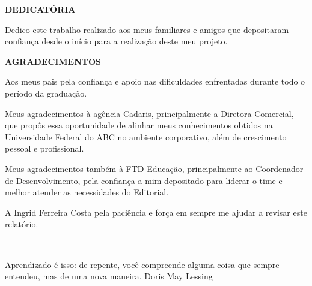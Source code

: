\documentclass[
  12pt,            %
  openany,
  oneside,
  a4paper,         %
  english,      %
  brazil
]{article}
\numberwithin{figure}{section}
\numberwithin{table}{section}
\begin{document}

\begin{titlepage}

\begin{center}
  \textbf{DEDICATÓRIA}
\end{center}

Dedico este trabalho realizado aos meus familiares e amigos que depositaram confiança desde o início para a realização deste meu projeto.

\end{titlepage}


\begin{titlepage}

\begin{center}
  \textbf{AGRADECIMENTOS}
\end{center}

Aos meus pais pela confiança e apoio nas dificuldades enfrentadas durante todo o período da graduação.

Meus agradecimentos à agência Cadaris, principalmente a Diretora Comercial, que propôs essa oportunidade de alinhar meus conhecimentos obtidos na Universidade Federal do ABC no ambiente corporativo, além de crescimento pessoal e profissional.

Meus agradecimentos também à FTD Educação, principalmente ao Coordenador de Desenvolvimento, pela confiança a mim depositado para liderar o time e melhor atender as necessidades do Editorial.

A Ingrid Ferreira Costa pela paciência e força em sempre me ajudar a revisar este relatório.

\end{titlepage}


\begin{titlepage}
~\\\vspace{18cm}
\begin{raggedleft}

  \begin{epigraph}
  {Aprendizado é isso: de repente, você compreende alguma coisa que sempre entendeu, mas de uma nova maneira.}
  {Doris May Lessing}
  \end{epigraph}

\end{raggedleft}

\end{titlepage}
\end{document}
